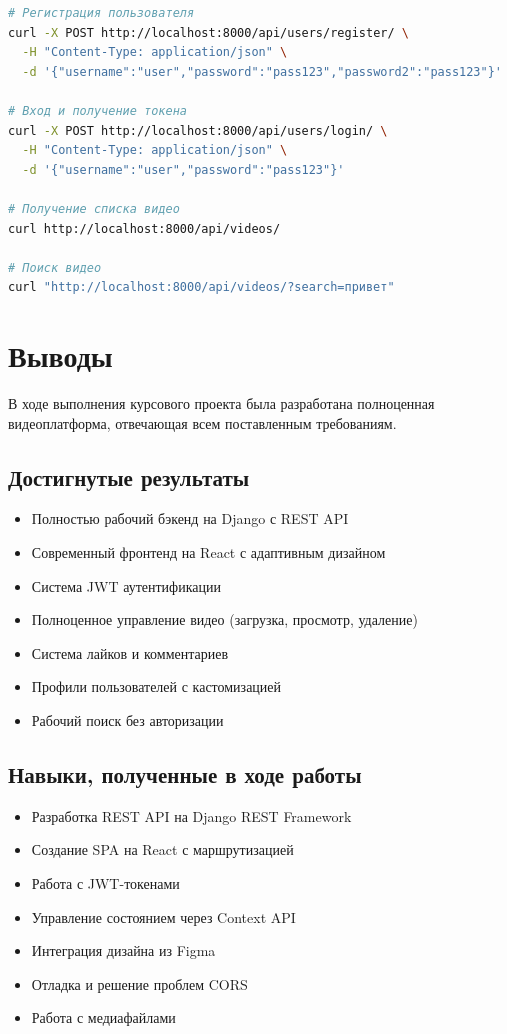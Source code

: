 \documentclass[12pt]{article}
\begin{document}
\begin{lstlisting}[language=bash, caption=Тестирование API через curl]
# Регистрация пользователя
curl -X POST http://localhost:8000/api/users/register/ \
  -H "Content-Type: application/json" \
  -d '{"username":"user","password":"pass123","password2":"pass123"}'

# Вход и получение токена
curl -X POST http://localhost:8000/api/users/login/ \
  -H "Content-Type: application/json" \
  -d '{"username":"user","password":"pass123"}'

# Получение списка видео
curl http://localhost:8000/api/videos/

# Поиск видео
curl "http://localhost:8000/api/videos/?search=привет"
\end{lstlisting}

\newpage

\section{Выводы}

В ходе выполнения курсового проекта была разработана полноценная видеоплатформа, отвечающая всем поставленным требованиям.

\subsection{Достигнутые результаты}

\begin{itemize}
    \item Полностью рабочий бэкенд на Django с REST API
    \item Современный фронтенд на React с адаптивным дизайном
    \item Система JWT аутентификации
    \item Полноценное управление видео (загрузка, просмотр, удаление)
    \item Система лайков и комментариев
    \item Профили пользователей с кастомизацией
    \item Рабочий поиск без авторизации
\end{itemize}

\subsection{Навыки, полученные в ходе работы}

\begin{itemize}
    \item Разработка REST API на Django REST Framework
    \item Создание SPA на React с маршрутизацией
    \item Работа с JWT-токенами
    \item Управление состоянием через Context API
    \item Интеграция дизайна из Figma
    \item Отладка и решение проблем CORS
    \item Работа с медиафайлами
\end{itemize}
\end{document}
